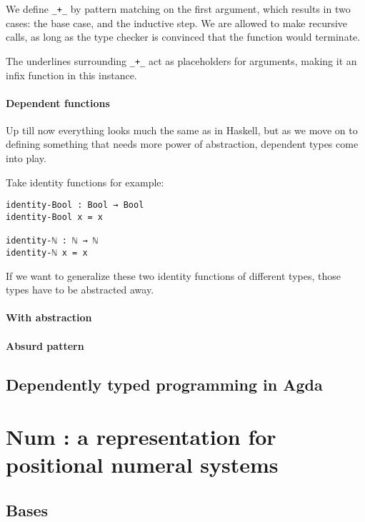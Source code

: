 \documentclass[12pt, a4paper]{article}
\begin{document}
We define {\lstinline|_+_|} by pattern matching on the first argument, which results
in two cases: the base case, and the inductive step. We are allowed to make
recursive calls, as long as the type checker is convinced that the function
would terminate.

The underlines surrounding {\lstinline|_+_|} act as placeholders for arguments, making
it an infix function in this instance.

\paragraph{Dependent functions}
Up till now everything looks much the same as in Haskell, but as we move on to
defining something that needs more power of abstraction, dependent types
come into play.

Take identity functions for example:

\begin{lstlisting}
identity-Bool : Bool → Bool
identity-Bool x = x

identity-ℕ : ℕ → ℕ
identity-ℕ x = x
\end{lstlisting}

If we want to generalize these two identity functions of different types, those
types have to be abstracted away.



\paragraph{With abstraction}

\paragraph{Absurd pattern}


\subsection{Dependently typed programming in Agda}


\section{Num : a representation for positional numeral systems}\label{representation}

\subsection{Bases}
\end{document}
